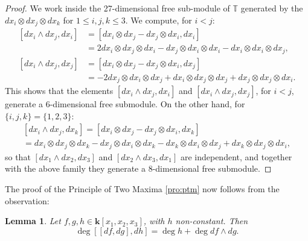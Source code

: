 \documentclass[reqno,oneside,11pt]{amsart}
\theoremstyle{plain}
\newtheorem{lemma}[theorem]{Lemma}
\theoremstyle{definition}
\newcommand{\TT}{\mathbb{T}} %
\newcommand{\K}{\mathbf{k}}
\renewcommand{\le}{\leqslant}
\begin{document}
\begin{proof}
We work inside the 27-dimensional free sub-module of $\TT$ generated by the $dx_i \otimes dx_j \otimes dx_k$ for $1 \le i,j,k \le 3$.
We compute, for $i < j$:
\begin{align*}
\left[dx_i \wedge  dx_j,dx_i\right]
&= \left[dx_i \otimes dx_j - dx_j \otimes dx_i ,dx_i\right] \\
&= 2 dx_i \otimes dx_j \otimes dx_i - dx_j \otimes dx_i \otimes dx_i - dx_i
\otimes dx_i \otimes dx_j, \\
\left[dx_i \wedge  dx_j,dx_j\right]
&= \left[dx_i \otimes dx_j - dx_j \otimes dx_i ,dx_j\right] \\
&= -2 dx_j \otimes dx_i \otimes dx_j + dx_i \otimes dx_j \otimes dx_j + dx_j
\otimes dx_j \otimes dx_i.
\end{align*}
This shows that the elements $\left[dx_i \wedge  dx_j,dx_i\right]$ and $\left[dx_i \wedge  dx_j,dx_j\right]$, for $i < j$, generate a 6-dimensional free submodule.
On the other hand, for $\{i,j,k\} = \{1,2,3\}$:
\begin{multline*}
\left[dx_i \wedge  dx_j,dx_k\right] = \left[dx_i \otimes dx_j - dx_j \otimes dx_i ,dx_k\right] \\
= dx_i \otimes dx_j \otimes dx_k - dx_j \otimes dx_i \otimes dx_k
- dx_k \otimes dx_i \otimes dx_j + dx_k \otimes dx_j \otimes dx_i,
\end{multline*}
so that $[dx_1 \wedge  dx_2, dx_3]$ and $[dx_2 \wedge  dx_3, dx_1]$ are
independent, and together with the above family  they generate a 8-dimensional
free submodule.
\end{proof}


The proof of the Principle of Two Maxima \ref{pro:ptm} now follows from the observation:

\begin{lemma} \label{lem:ptmbracket}
Let $f,g,h \in \K[x_1,x_2,x_3]$, with $h$ non-constant.
Then
$$\deg \left[ \left[df,dg\right], dh \right] = \deg h + \deg df \wedge dg.$$
\end{lemma}
\end{document}
